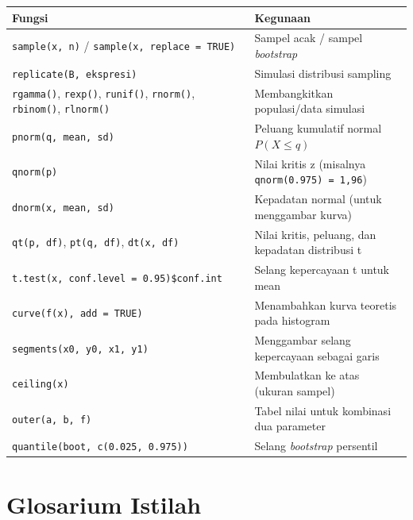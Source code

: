 \documentclass[
  indonesian,
  letterpaper,
]{book}
\newcounter{none} %
\begin{document}
{\def\LTcaptype{none} %
\begin{longtable}[]{@{}
  >{\raggedright\arraybackslash}p{}
  >{\raggedright\arraybackslash}p{}@{}}
\toprule\noalign{}
\begin{minipage}[b]{\linewidth}\raggedright
Fungsi
\end{minipage} & \begin{minipage}[b]{\linewidth}\raggedright
Kegunaan
\end{minipage} \\
\midrule\noalign{}
\endhead
\bottomrule\noalign{}
\endlastfoot
\texttt{sample(x,\ n)} / \texttt{sample(x,\ replace\ =\ TRUE)} & Sampel
acak / sampel \emph{bootstrap} \\
\texttt{replicate(B,\ ekspresi)} & Simulasi distribusi sampling \\
\texttt{rgamma()}, \texttt{rexp()}, \texttt{runif()}, \texttt{rnorm()},
\texttt{rbinom()}, \texttt{rlnorm()} & Membangkitkan populasi/data
simulasi \\
\texttt{pnorm(q,\ mean,\ sd)} & Peluang kumulatif normal
\(P(X \le q)\) \\
\texttt{qnorm(p)} & Nilai kritis z (misalnya
\texttt{qnorm(0.975)\ =\ 1,96}) \\
\texttt{dnorm(x,\ mean,\ sd)} & Kepadatan normal (untuk menggambar
kurva) \\
\texttt{qt(p,\ df)}, \texttt{pt(q,\ df)}, \texttt{dt(x,\ df)} & Nilai
kritis, peluang, dan kepadatan distribusi t \\
\texttt{t.test(x,\ conf.level\ =\ 0.95)\$conf.int} & Selang kepercayaan
t untuk mean \\
\texttt{curve(f(x),\ add\ =\ TRUE)} & Menambahkan kurva teoretis pada
histogram \\
\texttt{segments(x0,\ y0,\ x1,\ y1)} & Menggambar selang kepercayaan
sebagai garis \\
\texttt{ceiling(x)} & Membulatkan ke atas (ukuran sampel) \\
\texttt{outer(a,\ b,\ f)} & Tabel nilai untuk kombinasi dua parameter \\
\texttt{quantile(boot,\ c(0.025,\ 0.975))} & Selang \emph{bootstrap}
persentil \\
\end{longtable}
}

\section{Glosarium Istilah}\label{glosarium-istilah}
\end{document}
